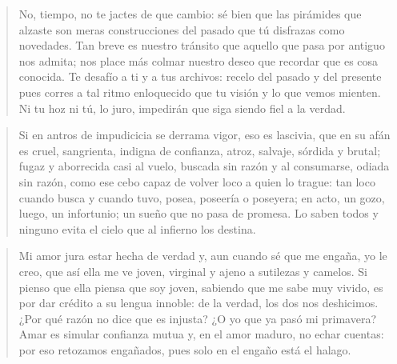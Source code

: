 \documentclass[12pt]{article}
\begin{document}
\clearpage
{}
\begin{verse}
No, tiempo, no te jactes de que cambio:  
sé bien que las pirámides que alzaste  
son meras construcciones del pasado  
que tú disfrazas como novedades.  
Tan breve es nuestro tránsito que aquello  
que pasa por antiguo nos admita;  
nos place más colmar nuestro deseo  
que recordar que es cosa conocida.  
Te desafío a ti y a tus archivos:  
recelo del pasado y del presente  
pues corres a tal ritmo enloquecido  
que tu visión y lo que vemos mienten.  
Ni tu hoz ni tú, lo juro, impedirán  
que siga siendo fiel a la verdad.

\end{verse}

\clearpage
{}
\begin{verse}
Si en antros de impudicicia se derrama  
vigor, eso es lascivia, que en su afán  
es cruel, sangrienta, indigna de confianza,  
atroz, salvaje, sórdida y brutal;  
fugaz y aborrecida casi al vuelo,  
buscada sin razón y al consumarse,  
odiada sin razón, como ese cebo  
capaz de volver loco a quien lo trague:  
tan loco cuando busca y cuando tuvo,  
posea, poseería o poseyera;  
en acto, un gozo, luego, un infortunio;  
un sueño que no pasa de promesa.  
Lo saben todos y ninguno evita  
el cielo que al infierno los destina.

\end{verse}

\clearpage
{}
\begin{verse}
Mi amor jura estar hecha de verdad  
y, aun cuando sé que me engaña, yo le creo,  
que así ella me ve joven, virginal  
y ajeno a sutilezas y camelos.  
Si pienso que ella piensa que soy joven,  
sabiendo que me sabe muy vivido,  
es por dar crédito a su lengua innoble:  
de la verdad, los dos nos deshicimos.  
¿Por qué razón no dice que es injusta?  
¿O yo que ya pasó mi primavera?  
Amar es simular confianza mutua  
y, en el amor maduro, no echar cuentas:  
por eso retozamos engañados,  
pues solo en el engaño está el halago.
\end{verse}
\end{document}
